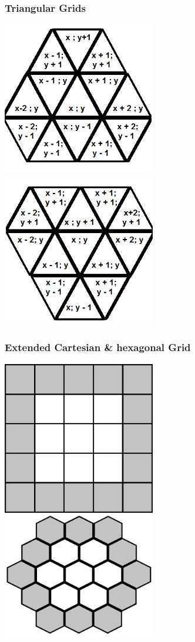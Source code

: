 \documentclass{beamer}
\begin{document}
\begin{frame}
\frametitle{Triangular Grids}
\includegraphics[width=0.5\textwidth]{imgs/triangle1.png}
\includegraphics[width=0.5\textwidth]{imgs/triangle2.png}
\end{frame}

\begin{frame}
\frametitle{Extended Cartesian \& hexagonal Grid}
\includegraphics[width=0.5\textwidth]{imgs/extendedcartesian.png}
\includegraphics[width=0.5\textwidth]{imgs/extendedhexagonal.png}
\end{frame}
\end{document}
